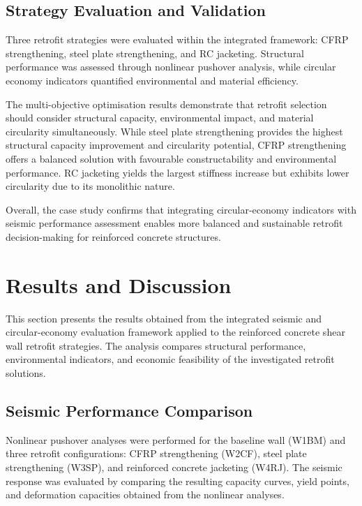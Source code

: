 \documentclass[fleqn,10pt]{wlscirep}
\begin{document}
\subsection{Strategy Evaluation and Validation}

Three retrofit strategies were evaluated within the integrated framework: CFRP strengthening, steel plate strengthening, and RC jacketing. Structural performance was assessed through nonlinear pushover analysis, while circular economy indicators quantified environmental and material efficiency.

The multi-objective optimisation results demonstrate that retrofit selection should consider structural capacity, environmental impact, and material circularity simultaneously. While steel plate strengthening provides the highest structural capacity improvement and circularity potential, CFRP strengthening offers a balanced solution with favourable constructability and environmental performance. RC jacketing yields the largest stiffness increase but exhibits lower circularity due to its monolithic nature.

Overall, the case study confirms that integrating circular-economy indicators with seismic performance assessment enables more balanced and sustainable retrofit decision-making for reinforced concrete structures.

\section{Results and Discussion}
\label{sec:results}

This section presents the results obtained from the integrated seismic and
circular-economy evaluation framework applied to the reinforced concrete
shear wall retrofit strategies. The analysis compares structural performance,
environmental indicators, and economic feasibility of the investigated
retrofit solutions.

\subsection{Seismic Performance Comparison}

Nonlinear pushover analyses were performed for the baseline wall (W1BM) and three retrofit configurations: CFRP strengthening (W2CF), steel plate strengthening (W3SP), and reinforced concrete jacketing (W4RJ). The seismic response was evaluated by comparing the resulting capacity curves, yield points, and deformation capacities obtained from the nonlinear analyses.
\end{document}
